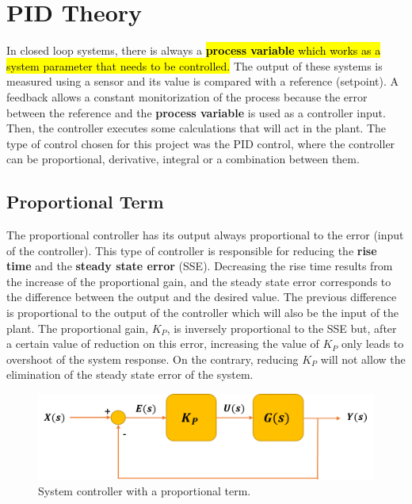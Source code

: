 \section{PID Theory}\label{sec:pid_theory}

In closed loop systems, there is always a \hl{\textbf{process variable} which works as a system parameter that needs to be controlled.} The output of these systems is measured using a sensor and its value is compared with a reference (setpoint). A feedback allows a constant monitorization of the process because the error between the reference and the \textbf{process variable} is used as a controller input. Then, the controller executes some calculations that will act in the plant. The type of control chosen for this project was the PID control, where the controller can be proportional, derivative, integral or a combination between them. %

\subsection*{Proportional Term}

The proportional controller has its output always proportional to the error (input of the controller). This type of controller is responsible for reducing the \textbf{rise time} and the \textbf{steady state error} (SSE). Decreasing the rise time results from the increase of the proportional gain, and the steady state error corresponds to the difference between the output and the desired value. The previous difference is proportional to the output of the controller which will also be the input of the plant. The proportional gain, $K_P$, is inversely proportional to the SSE but, after a certain value of reduction on this error, increasing the value of $K_P$ only leads to overshoot of the system response. On the contrary, reducing $K_P$ will not allow the elimination of the steady state error of the system. 

\begin{figure}[H]
	\centering
	\includegraphics[scale=0.6]{figures/propor_controller.png}
	\caption{System controller with a proportional term.}
	\label{propor_controller}
\end{figure}

